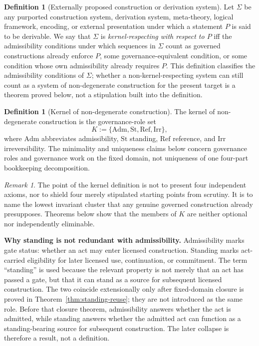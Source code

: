 \documentclass[11pt]{article}
\theoremstyle{definition}
\newtheorem{definition}[theorem]{Definition}
\theoremstyle{remark}
\newtheorem{remark}[theorem]{Remark}
\newcommand{\Adm}{\mathrm{Adm}}
\newcommand{\St}{\mathrm{St}}
\newcommand{\RefK}{\mathrm{Ref}}
\newcommand{\Irr}{\mathrm{Irr}}
\begin{document}
\begin{definition}[Externally proposed construction or derivation system]\label{def:kernel-respecting}
Let $\Sigma$ be any purported construction system, derivation system, meta-theory, logical framework, encoding, or external presentation under which a statement $P$ is said to be derivable. We say that $\Sigma$ is \emph{kernel-respecting with respect to $P$} iff the admissibility conditions under which sequences in $\Sigma$ count as governed constructions already enforce $P$, some governance-equivalent condition, or some condition whose own admissibility already requires $P$. This definition classifies the admissibility conditions of $\Sigma$; whether a non-kernel-respecting system can still count as a system of non-degenerate construction for the present target is a theorem proved below, not a stipulation built into the definition.
\end{definition}

\begin{definition}[Kernel of non-degenerate construction]\label{def:kernel}
The kernel of non-degenerate construction is the governance-role set
\[
K := \{\Adm, \St, \RefK, \Irr\},
\]
where $\Adm$ abbreviates admissibility, $\St$ standing, $\RefK$ reference, and $\Irr$ irreversibility. The minimality and uniqueness claims below concern governance roles and governance work on the fixed domain, not uniqueness of one four-part bookkeeping decomposition.
\end{definition}

\begin{remark}
The point of the kernel definition is not to present four independent axioms, nor to shield four merely stipulated starting points from scrutiny. It is to name the lowest invariant cluster that any genuine governed construction already presupposes. Theorems below show that the members of $K$ are neither optional nor independently eliminable.
\end{remark}


\medskip
\noindent\textbf{Why standing is not redundant with admissibility.} Admissibility marks gate status: whether an act may enter licensed construction. Standing marks act-carried eligibility for later licensed use, continuation, or commitment. The term ``standing'' is used because the relevant property is not merely that an act has passed a gate, but that it can stand as a source for subsequent licensed construction. The two coincide extensionally only after fixed-domain closure is proved in Theorem~\ref{thm:standing-reuse}; they are not introduced as the same role. Before that closure theorem, admissibility answers whether the act is admitted, while standing answers whether the admitted act can function as a standing-bearing source for subsequent construction. The later collapse is therefore a result, not a definition.
\end{document}
